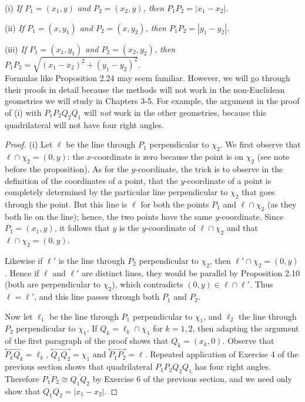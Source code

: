 \documentclass[leqno]{book}
\begin{document}
(i) \emph{If $P_1=(x_1,y)$ and $P_2=(x_2,y)$, then $P_1P_2=|x_1-x_2|$.}

(ii) \emph{If $P_1=(x,y_1)$ and $P_2=(x,y_2)$, then $P_1P_2=|y_1-y_2|$.}

(iii) \emph{If $P_1=(x_1,y_1)$ and $P_2=(x_2,y_2)$, then $P_1P_2=\sqrt{(x_1-x_2)^2+(y_1-y_2)^2}$.}\\

\noindent Formulas like Proposition 2.24 may seem familiar.  However, we will go through their proofs in detail because the methods will not work in the non-Euclidean geometries we will study in Chapters 3-5.  For example, the argument in the proof of (i) with $P_1P_2Q_2Q_1$ will \emph{not} work in the other geometries, because this quadrilateral will not have four right angles.
\begin{proof}
(i) Let $\ell$ be the line through $P_1$ perpendicular to $\chi_2$.  We first observe that $\ell\cap\chi_2=(0,y)$: the $x$-coordinate is zero because the point is on $\chi_2$ (see note before the proposition).  As for the $y$-coordinate, the trick is to observe in the definition of the coordinates of a point, that the $y$-coordinate of a point is completely determined by the particular line perpendicular to $\chi_2$ that goes through the point.  But this line is $\ell$ for both the points $P_1$ and $\ell\cap\chi_2$ (as they both lie on the line); hence, the two points have the same $y$-coordinate.  Since $P_1=(x_1,y)$, it follows that $y$ is the $y$-coordinate of $\ell\cap\chi_2$ and that $\ell\cap\chi_2=(0,y)$.

Likewise if $\ell'$ is the line through $P_2$ perpendicular to $\chi_2$, then $\ell'\cap\chi_2=(0,y)$.  Hence if $\ell$ and $\ell'$ are distinct lines, they would be parallel by Proposition 2.10 (both are perpendicular to $\chi_2$), which contradicts $(0,y)\in\ell\cap\ell'$.  Thus $\ell=\ell'$, and this line passes through both $P_1$ and $P_2$.

Now let $\ell_1$ be the line through $P_1$ perpendicular to $\chi_1$, and $\ell_2$ the line through $P_2$ perpendicular to $\chi_1$.  If $Q_k=\ell_k\cap\chi_1$ for $k=1,2$, then adapting the argument of the first paragraph of the proof shows that $Q_k=(x_k,0)$.  Observe that $\overset{\longleftrightarrow}{P_kQ_k}=\ell_k$, $\overset{\longleftrightarrow}{Q_1Q_2}=\chi_1$ and $\overset{\longleftrightarrow}{P_1P_2}=\ell$.  Repeated application of Exercise 4 of the previous section shows that quadrilateral $P_1P_2Q_2Q_1$ has four right angles.  Therefore $\overline{P_1P_2}\cong\overline{Q_1Q_2}$ by Exercise 6 of the previous section, and we need only show that $Q_1Q_2=|x_1-x_2|$.


\end{proof}
\end{document}
